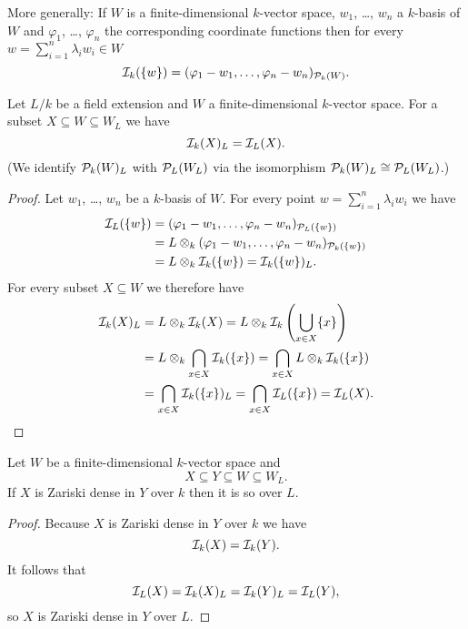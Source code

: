 More generally: If $W$ is a finite-dimensional $k$-vector space, $w_1$, \dots, $w_n$ a $k$-basis of $W$ and $\varphi_1$, \dots, $\varphi_n$ the corresponding coordinate functions then for every $w = \sum_{i=1}^n \lambda_i w_i \in W$
\[
  \mathcal{I}_k(\{w\}) = (\varphi_1 - w_1, \dotsc, \varphi_n - w_n)_{\mathcal{P}_k(W)}.
\]


\begin{lem}
  Let $L/k$ be a field extension and $W$ a finite-dimensional $k$-vector space. For a subset $X \subseteq W \subseteq W_L$ we have
  \[
    \mathcal{I}_k(X)_L = \mathcal{I}_L(X).
  \]
  (We identify $\mathcal{P}_k(W)_L$ with $\mathcal{P}_L(W_L)$ via the isomorphism $\mathcal{P}_k(W)_L \cong \mathcal{P}_L(W_L)$.)
\end{lem}
\begin{proof}
  Let $w_1$, \dots, $w_n$ be a $k$-basis of $W$. For every point $w = \sum_{i=1}^n \lambda_i w_i$ we have
  \begin{align*}
    \mathcal{I}_L(\{w\})
    &= (\varphi_1 - w_1, \dotsc, \varphi_n - w_n)_{\mathcal{P}_L(\{w\})} \\
    &= L \otimes_k (\varphi_1 - w_1, \dotsc, \varphi_n - w_n)_{\mathcal{P}_k(\{w\})} \\
    &= L \otimes_k \mathcal{I}_k(\{w\})
    = \mathcal{I}_k(\{w\})_L.
  \end{align*}
  For every subset $X \subseteq W$ we therefore have
  \begin{align*}
    \mathcal{I}_k(X)_L
    &= L \otimes_k \mathcal{I}_k(X)
    = L \otimes_k \mathcal{I}_k\left(\bigcup_{x \in X} \{x\}\right) \\
    &= L \otimes_k \bigcap_{x \in X} \mathcal{I}_k(\{x\})
    = \bigcap_{x \in X} L \otimes_k \mathcal{I}_k(\{x\}) \\
    &= \bigcap_{x \in X} \mathcal{I}_k(\{x\})_L
    = \bigcap_{x \in X} \mathcal{I}_L(\{x\})
    = \mathcal{I}_L(X).
    \qedhere
  \end{align*}
\end{proof}


\begin{cor}\label{cor: Zariski dense scalar extension}
  Let $W$ be a finite-dimensional $k$-vector space and
  \[
    X \subseteq Y \subseteq W \subseteq W_L.
  \]
  If $X$ is Zariski dense in $Y$ over $k$ then it is so over $L$.
\end{cor}
\begin{proof}
  Because $X$ is Zariski dense in $Y$ over $k$ we have
  \[
    \mathcal{I}_k(X) = \mathcal{I}_k(Y).
  \]
  It follows that
  \[
    \mathcal{I}_L(X) = \mathcal{I}_k(X)_L = \mathcal{I}_k(Y)_L = \mathcal{I}_L(Y),
  \]
  so $X$ is Zariski dense in $Y$ over $L$.
\end{proof}


